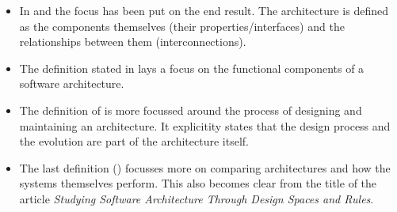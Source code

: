\documentclass{article}
\begin{document}
\begin{itemize}
\item In \cite{clemens} and \cite{hayesroth} the focus has been put on the end result. The architecture is defined as the components themselves (their properties/interfaces) and the relationships between them (interconnections).
\item The definition stated in \cite{hayesroth} lays a focus on the functional components of a software architecture.
\item The definition of \cite{IEEE1471} is more focussed around the process of designing and maintaining an architecture. It explicitity states that the design process and the evolution are part of the architecture itself.
\item The last definition (\cite{lane90}) focusses more on comparing architectures and how the systems themselves perform. This also becomes clear from the title of the article \emph{Studying Software Architecture Through Design Spaces and Rules}.

\end{itemize}



\end{document}
